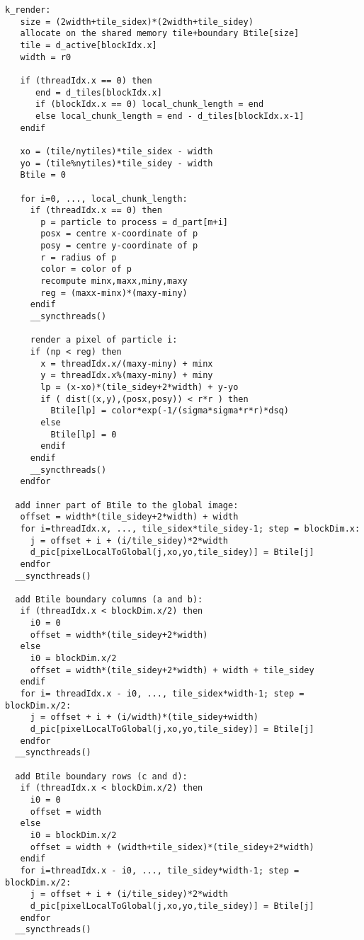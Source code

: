 \documentclass[11pt]{article}
\begin{document}
\begin{verbatim}
k_render:
   size = (2width+tile_sidex)*(2width+tile_sidey)
   allocate on the shared memory tile+boundary Btile[size]
   tile = d_active[blockIdx.x] 
   width = r0

   if (threadIdx.x == 0) then
      end = d_tiles[blockIdx.x]
      if (blockIdx.x == 0) local_chunk_length = end
      else local_chunk_length = end - d_tiles[blockIdx.x-1]
   endif

   xo = (tile/nytiles)*tile_sidex - width
   yo = (tile%nytiles)*tile_sidey - width
   Btile = 0

   for i=0, ..., local_chunk_length:
     if (threadIdx.x == 0) then
       p = particle to process = d_part[m+i]
       posx = centre x-coordinate of p
       posy = centre y-coordinate of p
       r = radius of p
       color = color of p
       recompute minx,maxx,miny,maxy
       reg = (maxx-minx)*(maxy-miny)
     endif
     __syncthreads()

     render a pixel of particle i:
     if (np < reg) then
       x = threadIdx.x/(maxy-miny) + minx
       y = threadIdx.x%(maxy-miny) + miny
       lp = (x-xo)*(tile_sidey+2*width) + y-yo
       if ( dist((x,y),(posx,posy)) < r*r ) then
         Btile[lp] = color*exp(-1/(sigma*sigma*r*r)*dsq)
       else 
         Btile[lp] = 0
       endif
     endif
     __syncthreads()
   endfor

  add inner part of Btile to the global image:
   offset = width*(tile_sidey+2*width) + width
   for i=threadIdx.x, ..., tile_sidex*tile_sidey-1; step = blockDim.x:
     j = offset + i + (i/tile_sidey)*2*width
     d_pic[pixelLocalToGlobal(j,xo,yo,tile_sidey)] = Btile[j]
   endfor 
  __syncthreads()

  add Btile boundary columns (a and b):
   if (threadIdx.x < blockDim.x/2) then
     i0 = 0
     offset = width*(tile_sidey+2*width)
   else
     i0 = blockDim.x/2
     offset = width*(tile_sidey+2*width) + width + tile_sidey
   endif
   for i= threadIdx.x - i0, ..., tile_sidex*width-1; step = blockDim.x/2:
     j = offset + i + (i/width)*(tile_sidey+width)
     d_pic[pixelLocalToGlobal(j,xo,yo,tile_sidey)] = Btile[j]
   endfor 
  __syncthreads()

  add Btile boundary rows (c and d):
   if (threadIdx.x < blockDim.x/2) then
     i0 = 0
     offset = width
   else
     i0 = blockDim.x/2
     offset = width + (width+tile_sidex)*(tile_sidey+2*width)
   endif
   for i=threadIdx.x - i0, ..., tile_sidey*width-1; step = blockDim.x/2:
     j = offset + i + (i/tile_sidey)*2*width
     d_pic[pixelLocalToGlobal(j,xo,yo,tile_sidey)] = Btile[j]
   endfor 
  __syncthreads()


\end{verbatim}
\end{document}
